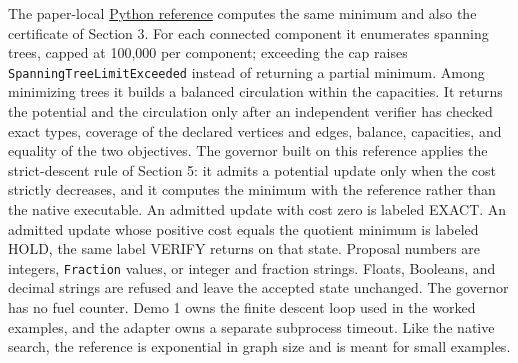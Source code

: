 \documentclass[
  11pt,
]{article}
\newcommand{\passthrough}[1]{#1}
\begin{document}
The paper-local
\href{https://github.com/dbccpage/the_symbol_game/blob/main/omega_engine_education/documentation/030_pfp_proposal_fidelity_protocol_pfp/papers/omega_engine_symbol_game/001_pfp_discrete_cochain_retraction_and_toy_involutions/code/symbol_game_governor.py}{Python
reference} computes the same minimum and also the certificate of Section
3. For each connected component it enumerates spanning trees, capped at
100,000 per component; exceeding the cap raises
\passthrough{\lstinline!SpanningTreeLimitExceeded!} instead of returning
a partial minimum. Among minimizing trees it builds a balanced
circulation within the capacities. It returns the potential and the
circulation only after an independent verifier has checked exact types,
coverage of the declared vertices and edges, balance, capacities, and
equality of the two objectives. The governor built on this reference
applies the strict-descent rule of Section 5: it admits a potential
update only when the cost strictly decreases, and it computes the
minimum with the reference rather than the native executable. An
admitted update with cost zero is labeled EXACT. An admitted update
whose positive cost equals the quotient minimum is labeled HOLD, the
same label VERIFY returns on that state. Proposal numbers are integers,
\passthrough{\lstinline!Fraction!} values, or integer and fraction
strings. Floats, Booleans, and decimal strings are refused and leave the
accepted state unchanged. The governor has no fuel counter. Demo 1 owns
the finite descent loop used in the worked examples, and the adapter
owns a separate subprocess timeout. Like the native search, the
reference is exponential in graph size and is meant for small examples.
\end{document}
